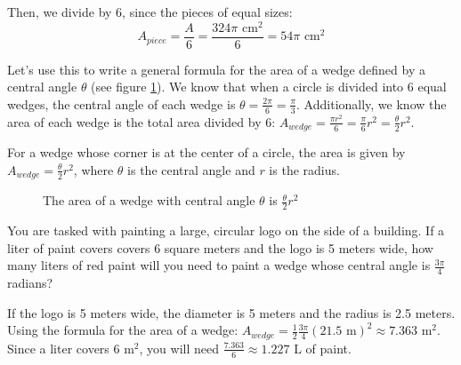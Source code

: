 Then, we divide by 6, since the pieces of equal sizes:
$$A_{piece} = \frac{A}{6} = \frac{324\pi\text{ cm}^2}{6} = 54\pi\text{ cm}^2$$

Let's use this to write a general formula for the area of a wedge defined by a 
central angle $\theta$ (see figure \ref{fig:wedge}). We know that when a 
circle is divided into 6 equal wedges, the central angle of each wedge is 
$\theta = \frac{2\pi}{6} = \frac{\pi}{3}$. Additionally, we know the area of 
each wedge is the total area divided by 6: $A_{wedge} = \frac{\pi r^2}{6} = 
\frac{\pi}{6} r^2 = \frac{\theta}{2} r^2$. 

\begin{mdframed}[style=important, frametitle={Area of a Wedge}]
For a wedge whose corner 
is at the center of a circle, the area is given by $A_{wedge} = \frac{\theta}{2} 
r^2$, where $\theta$ is the central angle and $r$ is the radius. 

\end{mdframed}

\begin{figure}[htbp]
\centering
{}
    \caption{The area of a wedge with central angle $\theta$ is $\frac{\theta}{2}r^2$}
    \label{fig:wedge}
\end{figure}

\begin{Exercise}[title = {Area of a Wedge}, label = wedge]
You are tasked with painting a large, circular logo on the side of a building. 
If a liter of paint covers covers 6 square meters and the logo is 5 meters 
wide, how many liters of red paint will you need to paint a wedge whose central 
angle is $\frac{3\pi}{4}$ radians?
\end{Exercise}

\begin{Answer}[ref = wedge]
If the logo is 5 meters wide, the diameter is 5 meters and the radius is 2.5 
meters. Using the formula for the area of a wedge: $A_{wedge} = \frac{1}{2}
\frac{3\pi}{4}(21.5\text{ m})^2 \approx 7.363\text{ m}^2$. Since a liter covers 
$6\text{ m}^2$, you will need $\frac{7.363}{6} \approx 1.227\text{ L}$ of paint. 
\end{Answer}

